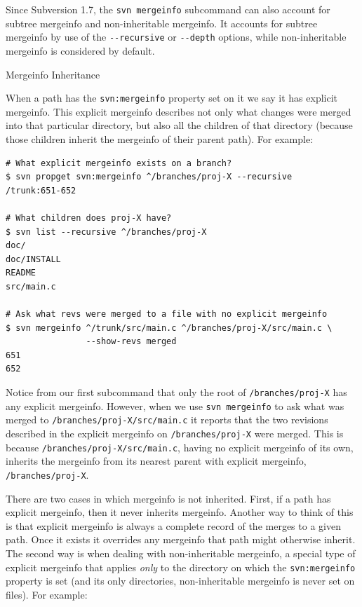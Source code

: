 Since Subversion 1.7, the \texttt{svn\ mergeinfo} subcommand can also
account for subtree mergeinfo and non-inheritable mergeinfo. It accounts
for subtree mergeinfo by use of the \texttt{-\/-recursive} or
\texttt{-\/-depth} options, while non-inheritable mergeinfo is
considered by default.

\protect{}\label{svn.branchmerge.basicmerging.mergeinfo.inheritance}
Mergeinfo Inheritance

When a path has the \texttt{svn:mergeinfo} property set on it we say it
has explicit mergeinfo. This explicit mergeinfo describes not only what
changes were merged into that particular directory, but also all the
children of that directory (because those children inherit the mergeinfo
of their parent path). For example:

\begin{verbatim}
# What explicit mergeinfo exists on a branch?
$ svn propget svn:mergeinfo ^/branches/proj-X --recursive
/trunk:651-652

# What children does proj-X have?
$ svn list --recursive ^/branches/proj-X
doc/
doc/INSTALL
README
src/main.c

# Ask what revs were merged to a file with no explicit mergeinfo
$ svn mergeinfo ^/trunk/src/main.c ^/branches/proj-X/src/main.c \
                --show-revs merged
651
652
\end{verbatim}

Notice from our first subcommand that only the root of
\texttt{/branches/proj-X} has any explicit mergeinfo. However, when we
use \texttt{svn\ mergeinfo} to ask what was merged to
\texttt{/branches/proj-X/src/main.c} it reports that the two revisions
described in the explicit mergeinfo on \texttt{/branches/proj-X} were
merged. This is because \texttt{/branches/proj-X/src/main.c}, having no
explicit mergeinfo of its own, inherits the mergeinfo from its nearest
parent with explicit mergeinfo, \texttt{/branches/proj-X}.

There are two cases in which mergeinfo is not inherited. First, if a
path has explicit mergeinfo, then it never inherits mergeinfo. Another
way to think of this is that explicit mergeinfo is always a complete
record of the merges to a given path. Once it exists it overrides any
mergeinfo that path might otherwise inherit. The second way is when
dealing with non-inheritable mergeinfo, a special type of explicit
mergeinfo that applies \emph{only} to the directory on which the
\texttt{svn:mergeinfo} property is set (and it\textquotesingle s only
directories, non-inheritable mergeinfo is never set on files). For
example:

